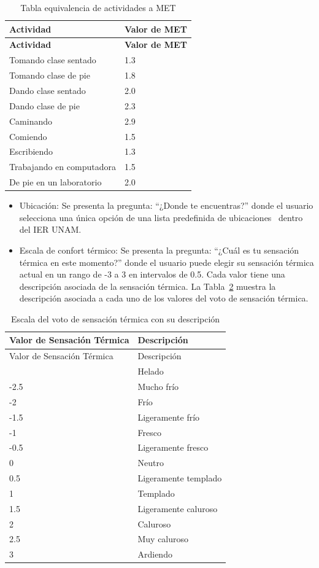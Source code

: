 \documentclass[
  letterpaper,
  DIV=11,
  numbers=noendperiod]{scrreport}
\begin{document}
\hypertarget{tbl-actividad}{}
\begin{longtable}[]{@{}ll@{}}
\caption{\label{tbl-actividad}Tabla equivalencia de actividades a
MET}\tabularnewline
\toprule\noalign{}
\textbf{Actividad} & \textbf{Valor de MET} \\
\midrule\noalign{}
\endfirsthead
\toprule\noalign{}
\textbf{Actividad} & \textbf{Valor de MET} \\
\midrule\noalign{}
\endhead
\bottomrule\noalign{}
\endlastfoot
Tomando clase sentado & 1.3 \\
Tomando clase de pie & 1.8 \\
Dando clase sentado & 2.0 \\
Dando clase de pie & 2.3 \\
Caminando & 2.9 \\
Comiendo & 1.5 \\
Escribiendo & 1.3 \\
Trabajando en computadora & 1.5 \\
De pie en un laboratorio & 2.0 \\
\end{longtable}

\begin{itemize}
\item
  Ubicación: Se presenta la pregunta: ``¿Donde te encuentras?'' donde el
  usuario selecciona una única opción de una lista predefinida de
  ubicaciones ~dentro del IER UNAM.
\item
  Escala de confort térmico: Se presenta la pregunta: ``¿Cuál es tu
  sensación térmica en este momento?'' donde el usuario puede elegir su
  sensación térmica actual en un rango de -3 a 3 en intervalos de 0.5.
  Cada valor tiene una descripción asociada de la sensación térmica. La
  Tabla~\ref{tbl-tsv} muestra la descripción asociada a cada uno de los
  valores del voto de sensación térmica.
\end{itemize}

\hypertarget{tbl-tsv}{}
\begin{longtable}[]{@{}ll@{}}
\caption{\label{tbl-tsv}Escala del voto de sensación térmica con su
descripción}\tabularnewline
\toprule\noalign{}
Valor de Sensación Térmica & Descripción \\
\midrule\noalign{}
\endfirsthead
\toprule\noalign{}
Valor de Sensación Térmica & Descripción \\
\midrule\noalign{}
\endhead
\bottomrule\noalign{}
\endlastfoot
-3 & Helado \\
-2.5 & Mucho frío \\
-2 & Frío \\
-1.5 & Ligeramente frío \\
-1 & Fresco \\
-0.5 & Ligeramente fresco \\
0 & Neutro \\
0.5 & Ligeramente templado \\
1 & Templado \\
1.5 & Ligeramente caluroso \\
2 & Caluroso \\
2.5 & Muy caluroso \\
3 & Ardiendo \\
\end{longtable}
\end{document}
